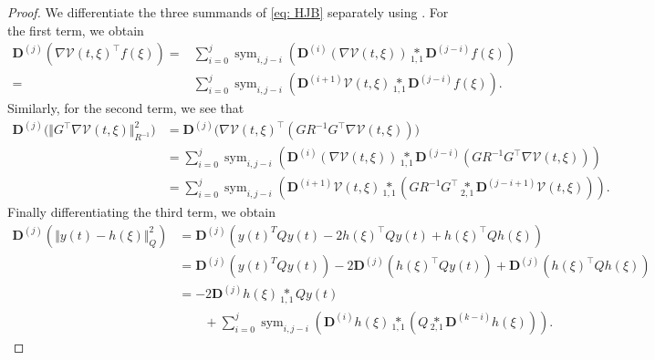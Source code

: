 \documentclass[11pt,reqno]{amsart}
\numberwithin{equation}{section}
\theoremstyle{plain}
\DeclareMathOperator{\Sym}{sym}
\newcommand{\tenp}[2]{\underset{#1,#2}{*}}
\newcommand{\TenDeriv}[1]{\mathbf{D}^{(#1)}}
\begin{document}
\begin{proof}
  We differentiate the three summands of \eqref{eq: HJB} separately using . 
  For the first term, we obtain
  \begin{align*}
    \TenDeriv{j} \left(  \nabla \mathcal{V}(t,\xi)^\top f(\xi)\right) =& \sum_{i=0}^{j} \Sym_{i,j-i} \left( \TenDeriv{i} \left( \nabla \mathcal{V}(t,\xi) \right) \tenp{1}{1} \TenDeriv{j-i}f(\xi) \right) \\
    =&  \sum_{i=0}^{j} \Sym_{i,j-i} \left( \TenDeriv{i+1} \mathcal{V}(t,\xi) \tenp{1}{1} \TenDeriv{j-i}f(\xi) \right).
  \end{align*}
  Similarly, for the second term, we see that
  \begin{align*}
    \TenDeriv{j}\bigl(\Vert G^\top \nabla \mathcal{V}(t,\xi) \Vert_{R^{-1}}^2 \bigr) &=
    \TenDeriv{j}\bigl( \nabla \mathcal{V}(t,\xi)^\top  (  G R^{-1}G^\top  \nabla \mathcal{V}(t,\xi) ) \bigr) \\
    &= \sum_{i=0}^{j} \Sym_{i,j-i} \left( \TenDeriv{i} \left( \nabla \mathcal{V}(t,\xi) \right) \tenp{1}{1} \TenDeriv{j-i}\left( G R^{-1}G^\top  \nabla \mathcal{V}(t,\xi) \right)  \right)\\
    &= \sum_{i=0}^{j}\Sym_{i,j-i} \left( \TenDeriv{i+1}  \mathcal{V}(t,\xi) \tenp{1}{1} \left(G R^{-1}G^\top \tenp{2}{1}\TenDeriv{j-i+1} \mathcal{V}(t,\xi) \right)  \right).
  \end{align*}
  Finally differentiating the third term, we obtain
  \begin{align*}
      \TenDeriv{j}\left(\Vert y(t) - h(\xi) \Vert_{Q}^2\right) 
      &= \TenDeriv{j}\left( y(t)^T Q y(t) -2  h(\xi)^\top Q y(t) + h(\xi)^\top Q h(\xi) \right)
      \\
      &= \TenDeriv{j}\left( y(t)^T Q y(t)\right) -2  \TenDeriv{j}\left(h(\xi)^\top Q y(t)\right) + \TenDeriv{j}\left(h(\xi)^\top Q h(\xi) \right)
      \\ 
      &= -2   \TenDeriv{j} h(\xi) \tenp{1}{1} Q y(t) 
      \\
      & \qquad + \sum_{i=0}^{j} \Sym_{i,j-i} \left(\TenDeriv{i} h(\xi) \tenp{1}{1} \left(Q \tenp{2}{1} \TenDeriv{k-i} h(\xi)\right) \right).
  \end{align*}
\end{proof}
\end{document}

